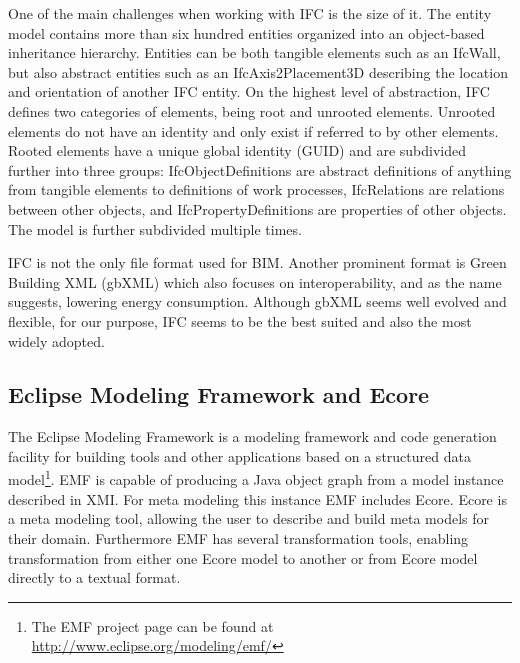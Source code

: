 One of the main challenges when working with IFC is the size of it. The entity model contains more than six hundred entities organized into an object-based inheritance hierarchy. Entities can be both tangible elements such as an IfcWall, but also abstract entities such as an IfcAxis2Placement3D describing the location and orientation of another IFC entity. On the highest level of abstraction, IFC defines two categories of elements, being root and unrooted elements. Unrooted elements do not have an identity and only exist if referred to by other elements. Rooted elements have a unique global identity (GUID) and are subdivided further into three groups: IfcObjectDefinitions are abstract definitions of anything from tangible elements to definitions of work processes, IfcRelations are relations between other objects, and IfcPropertyDefinitions are properties of other objects. The model is further subdivided multiple times.

IFC is not the only file format used for BIM. Another prominent format is Green Building XML (gbXML) which also focuses on interoperability, and as the name suggests, lowering energy consumption. Although gbXML seems well evolved and flexible, for our purpose, IFC seems to be the best suited and also the most widely adopted.

\subsection{Eclipse Modeling Framework and Ecore}
The Eclipse Modeling Framework is a modeling framework and code generation facility for building tools and other applications based on a structured data model\footnote{The EMF project page can be found at \url{http://www.eclipse.org/modeling/emf/}}. EMF is capable of producing a Java object graph from a model instance described in XMI. For meta modeling this instance EMF includes Ecore. Ecore is a meta modeling tool, allowing the user to describe and build meta models for their domain. Furthermore EMF has several transformation tools, enabling transformation from either one Ecore model to another or from Ecore model directly to a textual format.
